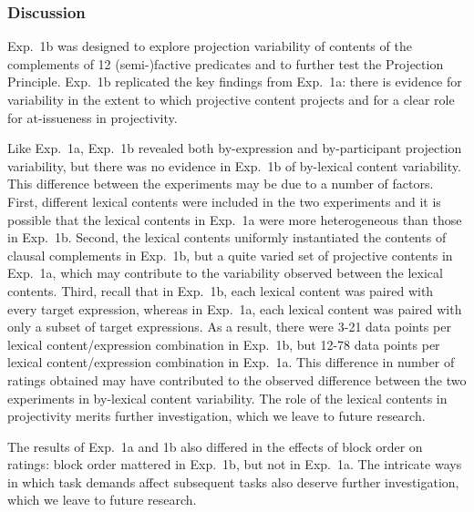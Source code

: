 \documentclass[11pt,fleqn]{article}
\newcommand{\6}{\mbox{$[\hspace*{-.6mm}[$}}
\newcommand{\9}{\mbox{$]\hspace*{-.6mm}]$}}
\begin{document}
%
%
%
%


\subsubsection{Discussion}

Exp.~1b was designed to explore projection variability of contents of the complements of 12 (semi-)factive predicates and to further test the Projection Principle. Exp.~1b replicated the key findings from Exp.~1a: there is evidence for variability in the extent to which projective content projects and for a clear role for at-issueness in projectivity.

Like Exp.~1a, Exp.~1b revealed both by-expression and by-participant projection variability, but there was no evidence in Exp.~1b of by-lexical content variability. This difference between the experiments may be due to a number of factors. First, different lexical contents were included in the two experiments and it is possible that the lexical contents in Exp.~1a were more heterogeneous than those in Exp.~1b. Second, the lexical contents uniformly instantiated the contents of clausal complements in Exp.~1b, but a quite varied set of projective contents in Exp.~1a, which may contribute to the variability observed between the lexical contents. Third, recall that in Exp.~1b, each lexical content was paired with every target expression, whereas in Exp.~1a, each lexical content was paired with only a subset of target expressions. As a result, there were 3-21 data points per lexical content/expression combination in Exp.~1b, but 12-78 data points per lexical content/expression combination in Exp.~1a. This difference in number of ratings obtained may have contributed to the observed difference between the two experiments in by-lexical content variability. The role of the lexical contents in projectivity merits further investigation, which we leave to future research. 

The results of Exp.~1a and 1b also differed in the effects of block order on ratings: block order mattered in Exp.~1b, but not in Exp.~1a. The intricate ways in which task demands affect subsequent tasks also deserve further investigation, which we leave to future research.
\end{document}

